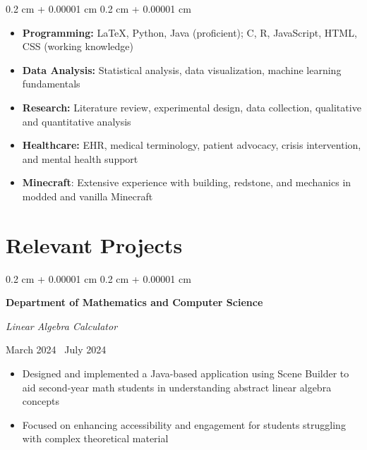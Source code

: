 \documentclass[10pt, letterpaper]{article}
\newenvironment{highlights}{
    \begin{itemize}[
        topsep=0.10 cm,
        parsep=0.10 cm,
        partopsep=0pt,
        itemsep=0pt,
        leftmargin=0.4 cm + 10pt
    ]
}{
    \end{itemize}
} %
\newenvironment{onecolentry}{
    \begin{adjustwidth}{
        0.2 cm + 0.00001 cm
    }{
        0.2 cm + 0.00001 cm
    }
}{
    \end{adjustwidth}
} %
\newenvironment{twocolentry}[2][]{
    \onecolentry
    \def\secondColumn{#2}
    \setcolumnwidth{\fill, 4.5 cm}
    \begin{paracol}{2}
}{
    \switchcolumn \raggedleft \secondColumn
    \end{paracol}
    \endonecolentry
} %
\begin{document}
\begin{onecolentry}
    \begin{highlights}
        \item \textbf{Programming:} \LaTeX, Python, Java (proficient); C, R, JavaScript, HTML, CSS (working knowledge)
        \item \textbf{Data Analysis:} Statistical analysis, data visualization, machine learning fundamentals
        \item \textbf{Research:} Literature review, experimental design, data collection, qualitative and quantitative analysis
        \item \textbf{Healthcare:} EHR, medical terminology, patient advocacy, crisis intervention, and mental health support
        \item \textbf{Minecraft}: Extensive experience with building, redstone, and mechanics in modded and vanilla Minecraft  
    \end{highlights}
\end{onecolentry}

\section{Relevant Projects}

\begin{twocolentry}
    {
        March 2024 \textendash\ July 2024 
    }
    \textbf{Department of Mathematics and Computer Science}

    \textit{Linear Algebra Calculator}

\end{twocolentry}

\vspace{0.1cm}
\begin{highlights}
    \item Designed and implemented a Java-based application using Scene Builder to aid second-year math students in understanding abstract linear algebra concepts
    \item Focused on enhancing accessibility and engagement for students struggling with complex theoretical material
\end{highlights}
\end{document}
